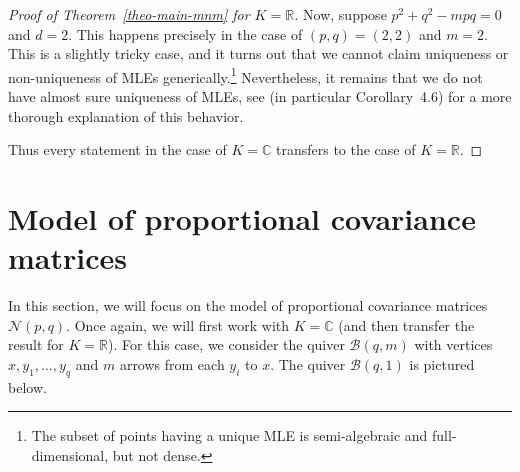 \documentclass[11pt]{amsart}
\theoremstyle{definition}
\newcommand{\R}{{\mathbb R}}
\newcommand{\C}{{\mathbb C}}
\begin{document}
\begin{proof} [Proof of Theorem~\ref{theo-main-mnm} for $K = \R$]
Now, suppose $p^2 + q^2 - mpq = 0$ and $d = 2$. This happens precisely in the case of $(p,q) = (2,2)$ and $m = 2$. This is a slightly tricky case, and it turns out that we cannot claim uniqueness or non-uniqueness of MLEs generically.\footnote{The subset of points having a unique MLE is semi-algebraic and full-dimensional, but not dense.} Nevertheless, it remains that we do not have almost sure uniqueness of MLEs, see \cite[Section~4]{Drton-etal} (in particular Corollary~4.6) for a more thorough explanation of this behavior. 

Thus every statement in the case of $K = \C$ transfers to the case of $K = \R$.
\end{proof}
















\section{Model of proportional covariance matrices} \label{sec:diagonal}
In this section, we will focus on the model of proportional covariance matrices $\mathcal{N}(p,q)$. Once again, we will first work with $K = \C$ (and then transfer the result for $K = \R$). For this case, we consider the quiver $\mathcal{B}(q,m)$ with vertices $x,y_1,\dots,y_q$ and $m$ arrows from each $y_i$ to $x$. The quiver $\mathcal{B}(q,1)$ is pictured below.

\begin{center}
\end{center}
\end{document}
